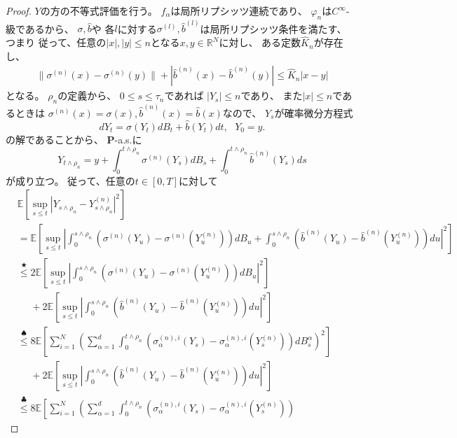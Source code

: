 \documentclass[uplatex]{jsarticle}
\theoremstyle{definition}
\def\R{\mathbb{R}}
\def\P{\mathbf{P}}
\def\E{\mathbb{E}}
\begin{document}
\begin{proof}
  \(Y\)の方の不等式評価を行う。
  \(f_\alpha\)は局所リプシッツ連続であり、
  \(\varphi_n\)は\(C^{\infty}\)-級であるから、
  \(\sigma,\hat{b}\)や
  各\(l\)に対する\(\sigma^{(l)},\hat{b}^{(l)}\)は局所リプシッツ条件を満たす、
  つまり
  従って、任意の\(|x|,|y| \leq n\)となる\(x,y\in \R^N\)に対し、
  ある定数\(\hat{K}_n\)が存在し、
  \begin{align*}
    \| \sigma^{(n)}(x) - \sigma^{(n)}(y) \| + |\hat{b}^{(n)}(x) - \hat{b}^{(n)}(y)|
    \leq \hat{K}_n|x-y|
  \end{align*}
  となる。
  \(\rho_n\)の定義から、
  \(0 \leq s \leq \tau_n\)であれば
  \(|Y_s| \leq n\)であり、
  また\(|x| \leq n\)であるときは
  \(\sigma^{(n)}(x) = \sigma(x), \hat{b}^{(n)}(x) = \hat{b}(x)\)なので、
  \(Y_s\)が確率微分方程式
  \[
  dY_t = \sigma(Y_t) dB_t + \hat{b}(Y_t)dt,
  \ \ \ Y_0 = y.
  \]
  の解であることから、
  \(\P\)-a.s.に
  \[
  Y_{t\wedge \rho_n}
  = y + \int_0^{t\wedge \rho_n}\sigma^{(n)}(Y_s) dB_s
  + \int_0^{t\wedge \rho_n} \hat{b}^{(n)}(Y_s)ds
  \]
  が成り立つ。
  従って、任意の\(t\in [0,T]\)に対して
  \begin{align*}
    &\E \left[ \sup_{s \leq t} \left|
    Y_{s\wedge \rho_n} - Y_{s\wedge \rho_n}^{(n)}\right|^2\right] \\
    &= \E \left[ \sup_{s \leq t} \left|
    \int_0^{s\wedge \rho_n}
    \left( \sigma^{(n)}(Y_u) - \sigma^{(n)}(Y_u^{(n)})\right) dB_u
    + \int_0^{s\wedge \rho_n}
    \left( \hat{b}^{(n)}(Y_u) - \hat{b}^{(n)}(Y_u^{(n)})\right) du
    \right|^2\right] \\
    &\overset{\bigstar}{\leq}
    2 \E \left[ \sup_{s \leq t} \left| \int_0^{s\wedge \rho_n}
    \left( \sigma^{(n)}(Y_u) - \sigma^{(n)}(Y_u^{(n)})\right) dB_u \right|^2\right] \\
    &\ \ \ \ \ \
    + 2 \E \left[ \sup_{s \leq t} \left| \int_0^{s\wedge \rho_n}
    \left( \hat{b}^{(n)}(Y_u) - \hat{b}^{(n)}(Y_u^{(n)})\right) du \right|^2\right] \\
    &\overset{\spadesuit}{\leq}
    8 \E \left[ \sum_{i=1}^N \left( \sum_{\alpha=1}^d \int_0^{t\wedge \rho_n}
    \left( \sigma_\alpha^{(n),i}(Y_s) - \sigma_\alpha^{(n),i}(Y_s^{(n)})\right)
    dB_s^\alpha \right)^2\right] \\
    &\ \ \ \ \ \
    + 2 \E \left[ \sup_{s \leq t} \left| \int_0^{s\wedge \rho_n}
    \left( \hat{b}^{(n)}(Y_u) - \hat{b}^{(n)}(Y_u^{(n)})\right) du \right|^2\right] \\
    &\overset{\clubsuit}{\leq}
    8 \E \left[ \sum_{i=1}^N \left( \sum_{\alpha=1}^d \int_0^{t\wedge \rho_n}
    \left( \sigma_\alpha^{(n),i}(Y_s) - \sigma_\alpha^{(n),i}(Y_s^{(n)})\right)

\end{align*}
\end{proof}
\end{document}
